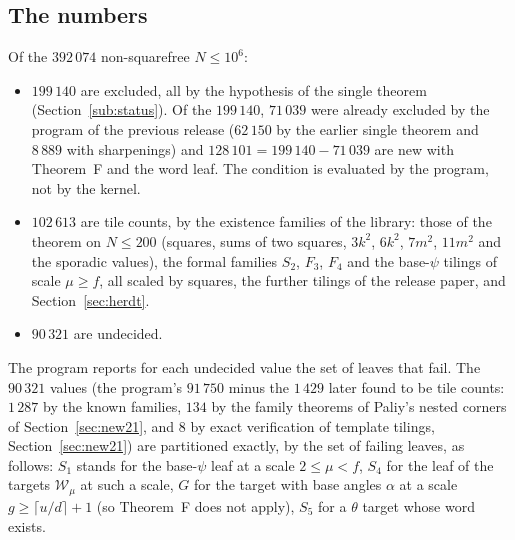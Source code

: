 \documentclass[11pt,reqno]{amsart}
\theoremstyle{plain}
\theoremstyle{definition}
\begin{document}
\subsection{The numbers}
Of the $392\,074$ non-squarefree $N\le10^6$:
\begin{itemize}
\item $199\,140$ are excluded, all by the hypothesis of the single theorem  (Section~\ref{sub:status}). Of the $199\,140$, $71\,039$ were already excluded by the program of the previous release ($62\,150$ by the earlier single theorem and $8\,889$ with sharpenings) and $128\,101=199\,140-71\,039$ are new with Theorem~F and the word leaf.
The condition is evaluated by the program, not by the kernel.
\item $102\,613$ are tile counts, by the existence families of the library: those of the theorem on $N\le200$ (squares, sums of two squares, $3k^2$, $6k^2$, $7m^2$, $11m^2$ and the sporadic values), the formal families $S_2$, $F_3$, $F_4$ and the base-$\psi$ tilings of scale $\mu\ge f$, all scaled by
squares, the further tilings of the release paper, and Section~\ref{sec:herdt}.
\item $90\,321$ are undecided.
\end{itemize}
The program reports for each undecided value the set of leaves that fail. The $90\,321$ values (the program's $91\,750$ minus the $1\,429$ later found to be tile counts: $1\,287$ by the known families, $134$ by the family theorems of Paliy's nested corners of Section~\ref{sec:new21}, and $8$ by exact verification of template tilings, Section~\ref{sec:new21}) are partitioned
exactly, by the set of failing leaves, as follows: $S_1$ stands for the base-$\psi$ leaf at a scale $2\le \mu<f$, $S_4$ for the leaf of the targets $\mathcal W_\mu$ at such a scale, $G$ for the target with base angles $\alpha$ at a scale
$g\ge\lceil u/d\rceil+1$ (so Theorem~F does not apply), $S_5$ for a $\theta$ target whose word exists.
\end{document}
